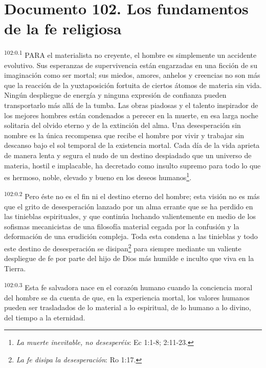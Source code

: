 \chapter{Documento 102. Los fundamentos de la fe religiosa}
\par
\textsuperscript{102:0.1} PARA el materialista no creyente, el hombre es simplemente un accidente evolutivo. Sus esperanzas de supervivencia están engarzadas en una ficción de su imaginación como ser mortal; sus miedos, amores, anhelos y creencias no son más que la reacción de la yuxtaposición fortuita de ciertos átomos de materia sin vida. Ningún despliegue de energía y ninguna expresión de confianza pueden transportarlo más allá de la tumba. Las obras piadosas y el talento inspirador de los mejores hombres están condenados a perecer en la muerte, en esa larga noche solitaria del olvido eterno y de la extinción del alma. Una desesperación sin nombre es la única recompensa que recibe el hombre por vivir y trabajar sin descanso bajo el sol temporal de la existencia mortal. Cada día de la vida aprieta de manera lenta y segura el nudo de un destino despiadado que un universo de materia, hostil e implacable, ha decretado como insulto supremo para todo lo que es hermoso, noble, elevado y bueno en los deseos humanos\footnote{\textit{La muerte inevitable, no desesperéis}: Ec 1:1-8; 2:11-23.}.

\par
\textsuperscript{102:0.2} Pero éste no es el fin ni el destino eterno del hombre; esta visión no es más que el grito de desesperación lanzado por un alma errante que se ha perdido en las tinieblas espirituales, y que continúa luchando valientemente en medio de los sofismas mecanicistas de una filosofía material cegada por la confusión y la deformación de una erudición compleja. Toda esta condena a las tinieblas y todo este destino de desesperación se disipan\footnote{\textit{La fe disipa la desesperación}: Ro 1:17.} para siempre mediante un valiente despliegue de fe por parte del hijo de Dios más humilde e inculto que viva en la Tierra.

\par
\textsuperscript{102:0.3} Esta fe salvadora nace en el corazón humano cuando la conciencia moral del hombre se da cuenta de que, en la experiencia mortal, los valores humanos pueden ser trasladados de lo material a lo espiritual, de lo humano a lo divino, del tiempo a la eternidad.

